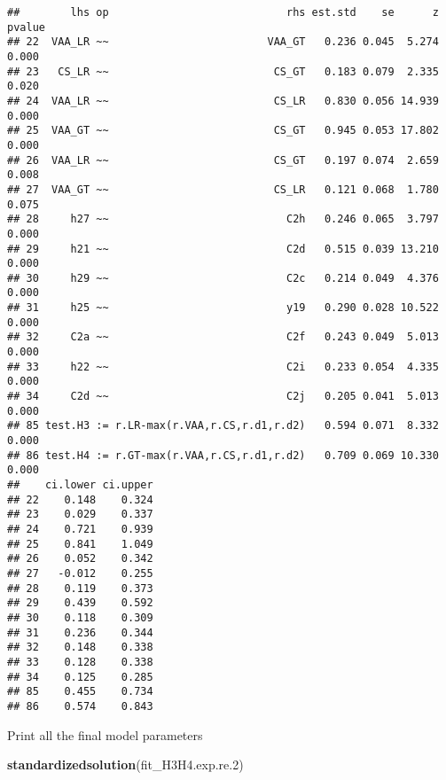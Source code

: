 \documentclass[
]{article}
\newenvironment{Shaded}{\begin{snugshade}}{\end{snugshade}}
\newcommand{\FloatTok}[1]{\textcolor[rgb]{0.00,0.00,0.81}{#1}}
\newcommand{\KeywordTok}[1]{\textcolor[rgb]{0.13,0.29,0.53}{\textbf{#1}}}
\newcommand{\NormalTok}[1]{#1}
\begin{document}
\begin{verbatim}
##        lhs op                            rhs est.std    se      z pvalue
## 22  VAA_LR ~~                         VAA_GT   0.236 0.045  5.274  0.000
## 23   CS_LR ~~                          CS_GT   0.183 0.079  2.335  0.020
## 24  VAA_LR ~~                          CS_LR   0.830 0.056 14.939  0.000
## 25  VAA_GT ~~                          CS_GT   0.945 0.053 17.802  0.000
## 26  VAA_LR ~~                          CS_GT   0.197 0.074  2.659  0.008
## 27  VAA_GT ~~                          CS_LR   0.121 0.068  1.780  0.075
## 28     h27 ~~                            C2h   0.246 0.065  3.797  0.000
## 29     h21 ~~                            C2d   0.515 0.039 13.210  0.000
## 30     h29 ~~                            C2c   0.214 0.049  4.376  0.000
## 31     h25 ~~                            y19   0.290 0.028 10.522  0.000
## 32     C2a ~~                            C2f   0.243 0.049  5.013  0.000
## 33     h22 ~~                            C2i   0.233 0.054  4.335  0.000
## 34     C2d ~~                            C2j   0.205 0.041  5.013  0.000
## 85 test.H3 := r.LR-max(r.VAA,r.CS,r.d1,r.d2)   0.594 0.071  8.332  0.000
## 86 test.H4 := r.GT-max(r.VAA,r.CS,r.d1,r.d2)   0.709 0.069 10.330  0.000
##    ci.lower ci.upper
## 22    0.148    0.324
## 23    0.029    0.337
## 24    0.721    0.939
## 25    0.841    1.049
## 26    0.052    0.342
## 27   -0.012    0.255
## 28    0.119    0.373
## 29    0.439    0.592
## 30    0.118    0.309
## 31    0.236    0.344
## 32    0.148    0.338
## 33    0.128    0.338
## 34    0.125    0.285
## 85    0.455    0.734
## 86    0.574    0.843
\end{verbatim}

Print all the final model parameters

\begin{Shaded}
\begin{Highlighting}[]
\KeywordTok{standardizedsolution}\NormalTok{(fit_H3H4.exp.re}\FloatTok{.2}\NormalTok{)}
\end{Highlighting}
\end{Shaded}
\end{document}
